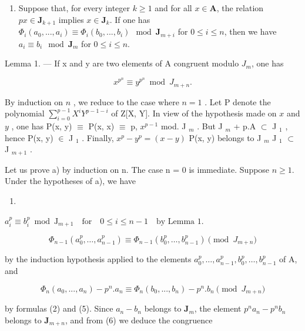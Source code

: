 \begin{enumerate}
\def\labelenumi{\alph{enumi})}
\setcounter{enumi}{1}
\tightlist
\item
  Suppose that, for every integer \(k \geqslant 1\) and for all \(x \in \mathbf{A}\), the relation \(p x \in \mathbf{J}_{k+1}\) implies \(x \in \mathbf{J}_k\). If one has \(\Phi_i(a_0, ..., a_i) \equiv \Phi_i(b_0, ..., b_i) \mod \mathbf{J}_{m+i}\) for \(0 \leqslant i \leqslant n\), then we have \(a_i \equiv b_i \mod \mathbf{J}_m\) for \(0 \leqslant i \leqslant n\).
\end{enumerate}

Lemma 1. --- If x and y are two elements of A congruent modulo \(J_{m}\), one has

\[
x ^ {p ^ {n}} \equiv y ^ {p ^ {n}} \bmod J _ {m + n}.
\]

By induction on \(n\) , we reduce to the case where \(n=1\) . Let P denote the polynomial \(\sum_{i=0}^{p-1} X^i Y^{p-1-i}\) of Z{[}X, Y{]}. In view of the hypothesis made on \(x\) and \(y\) , one has P(x, y) \(\equiv\) P(x, x) \(\equiv\) p, \(x^{p-1}\) mod. J \(_m\) . But J \(_m\) + p.A \(\subset\) J \(_1\) , hence P(x, y) \(\in\) J \(_1\) . Finally, \(x^p - y^p = (x - y)\) P(x, y) belongs to J \(_m\) J \(_1\) \(\subset\) J \(_{m+1}\) .

Let us prove a) by induction on n. The case n = 0 is immediate. Suppose \(n \geqslant 1\). Under the hypotheses of a), we have

\begin{enumerate}
\def\labelenumi{(\arabic{enumi})}
\setcounter{enumi}{3}
\tightlist
\item
\end{enumerate}

\(a_{i}^{p}\equiv b_{i}^{p}\bmod \mathrm{J}_{m + 1}\quad \text{for}\quad 0\leqslant i\leqslant n - 1\quad \text{by Lemma } 1.\)

\[
\Phi_ {n - 1} (a _ {0} ^ {p}, \dots , a _ {n - 1} ^ {p}) \equiv \Phi_ {n - 1} (b _ {0} ^ {p}, \dots , b _ {n - 1} ^ {p}) \pmod{J _ {m + n}}\tag{5}
\]

by the induction hypothesis applied to the elements \(a_0^p, \ldots, a_{n-1}^p, b_0^p, \ldots, b_{n-1}^p\) of A, and

\[
\Phi_ {n} (a _ {0},..., a _ {n}) - p ^ {n}. a _ {n} \equiv \Phi_ {n} (b _ {0},..., b _ {n}) - p ^ {n}. b _ {n} \pmod{J _ {m + n}}\tag{6}
\]

by formulas (2) and (5). Since \(a_{n}-b_{n}\) belongs to \(\mathbf{J}_{m}\), the element \(p^{n}a_{n}-p^{n}b_{n}\) belongs to \(\mathbf{J}_{m+n}\), and from (6) we deduce the congruence

